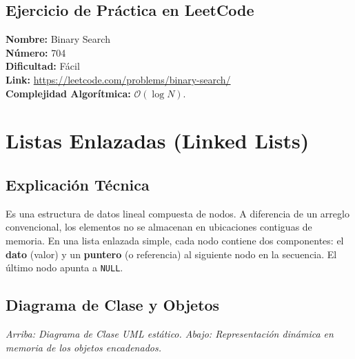 \documentclass[12pt]{article}
\begin{document}
\subsection{Ejercicio de Práctica en LeetCode}
\textbf{Nombre:} Binary Search \\
\textbf{Número:} 704 \\
\textbf{Dificultad:} Fácil \\
\textbf{Link:} \url{https://leetcode.com/problems/binary-search/} \\
\textbf{Complejidad Algorítmica:} $\mathcal{O}(\log N)$.

\newpage
\section{Listas Enlazadas (Linked Lists)}
\subsection{Explicación Técnica}
Es una estructura de datos lineal compuesta de nodos. A diferencia de un arreglo convencional, los elementos no se almacenan en ubicaciones contiguas de memoria. En una lista enlazada simple, cada nodo contiene dos componentes: el \textbf{dato} (valor) y un \textbf{puntero} (o referencia) al siguiente nodo en la secuencia. El último nodo apunta a \texttt{NULL}.

\subsection{Diagrama de Clase y Objetos}
\begin{center}
\end{center}
\textit{Arriba: Diagrama de Clase UML estático. Abajo: Representación dinámica en memoria de los objetos encadenados.}
\end{document}
